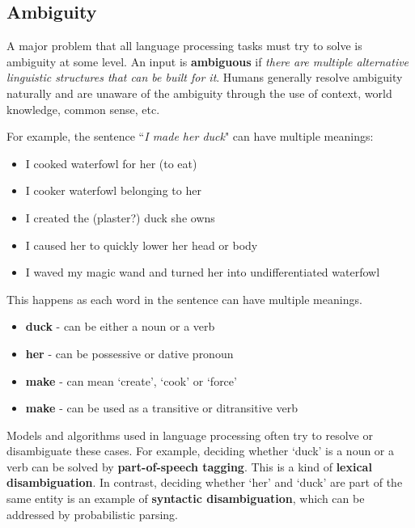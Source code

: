 \documentclass{sty/SizheArticle}
\begin{document}
\subsection{Ambiguity}
A major problem that all language processing tasks must try to solve is
ambiguity at some level. An input is \textbf{ambiguous} if \textit{there are
multiple alternative linguistic structures that can be built for it}.
Humans generally resolve ambiguity naturally and are unaware of the ambiguity
through the use of context, world knowledge, common sense, etc.

For example, the sentence ``\textit{I made her duck}" can have multiple meanings:
\begin{itemize}
\item I cooked waterfowl for her (to eat)
\item I cooker waterfowl belonging to her
\item I created the (plaster?) duck she owns
\item I caused her to quickly lower her head or body
\item I waved my magic wand and turned her into undifferentiated waterfowl
\end{itemize}
This happens as each word in the sentence can have multiple meanings.
\begin{itemize}
\item \textbf{duck} - can be either a noun or a verb
\item \textbf{her} - can be possessive or dative pronoun
\item \textbf{make} - can mean `create', `cook' or `force'
\item \textbf{make} - can be used as a transitive or ditransitive verb
\end{itemize}
Models and algorithms used in language processing often try to resolve or
disambiguate these cases. For example, deciding whether `duck' is a noun or a
verb can be solved by \textbf{part-of-speech tagging}. This is a kind of
\textbf{lexical disambiguation}. In contrast, deciding whether `her' and `duck'
are part of the same entity is an example of \textbf{syntactic disambiguation},
which can be addressed by probabilistic parsing.




\end{document}
